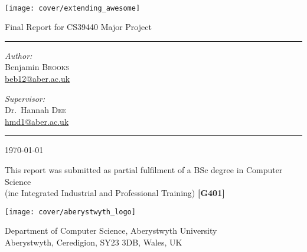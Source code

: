 \begin{titlepage}
	\begin{center}
	
	~\\
	
	\vspace{2cm}
	\texttt{[image: cover/extending\_awesome]} \\
	\vspace{2cm}
	
	{ \Large Final Report for CS39440 Major Project }
	\vspace{0.5cm}

	\hrule
	\vspace{0.25cm}
	\noindent
	\begin{minipage}[t]{0.4\textwidth}
		\begin{flushleft} \large
			\emph{Author:}\\
			Benjamin \textsc{Brooks}\\
			\href{mailto:beb12@aber.ac.uk}{beb12@aber.ac.uk}
		\end{flushleft}
	\end{minipage}%
	\begin{minipage}[t]{0.4\textwidth}
		\begin{flushright} \large
			\emph{Supervisor:} \\
			Dr.~Hannah \textsc{Dee}\\
			\href{mailto:hmd1@aber.ac.uk}{hmd1@aber.ac.uk}
		\end{flushright}
	\end{minipage}
	\vspace{0.5cm}
	\hrule
	\vspace{0.5cm}
	
	{ \Large \today }

	\vfill
	
	\vspace{1cm}
	This report was submitted as partial fulfilment of a BSc degree in Computer Science \\
	(inc Integrated Industrial and Professional Training) \textbf{[G401]}
	\vspace{1cm}
	
	\texttt{[image: cover/aberystwyth\_logo]}
	
	{ \footnotesize Department of Computer Science, Aberystwyth University } \\	
	{ \scriptsize Aberystwyth, Ceredigion, SY23 3DB, Wales, UK }
	
	\vspace{-3cm}

	\end{center}

	\ifpaper
		\newpage
		~
	\fi

\end{titlepage}
